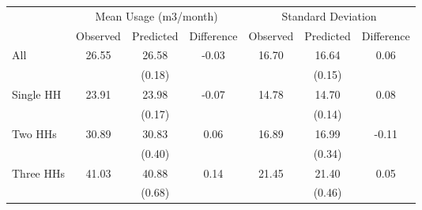 \begin{tabular}{lcccccc}
  & \multicolumn{3}{c}{Mean Usage (m3/month)} & \multicolumn{3}{c}{Standard Deviation}  \\
  & Observed & Predicted  & Difference &  Observed & Predicted  & Difference \\
\hline
All &26.55&26.58&-0.03&16.70&16.64&0.06\\
 & & (0.18) & & & (0.15) & \\
Single HH &23.91&23.98&-0.07&14.78&14.70&0.08\\
 & & (0.17) & & & (0.14) & \\
Two HHs &30.89&30.83&0.06&16.89&16.99&-0.11\\
 & & (0.40) & & & (0.34) & \\
Three HHs &41.03&40.88&0.14&21.45&21.40&0.05\\
 & & (0.68) & & & (0.46) & \\
\hline
\end{tabular} 
